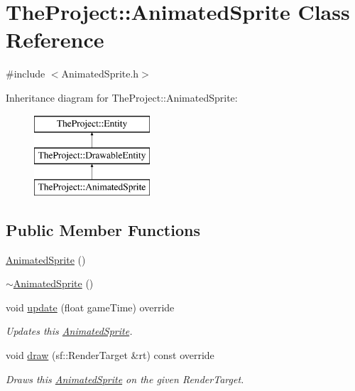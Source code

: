 \hypertarget{class_the_project_1_1_animated_sprite}{}\section{The\+Project\+:\+:Animated\+Sprite Class Reference}
\label{class_the_project_1_1_animated_sprite}


{\ttfamily \#include $<$Animated\+Sprite.\+h$>$}

Inheritance diagram for The\+Project\+:\+:Animated\+Sprite\+:\begin{figure}[H]
\begin{center}
\leavevmode
\includegraphics[height=3.000000cm]{class_the_project_1_1_animated_sprite}
\end{center}
\end{figure}
\subsection*{Public Member Functions}
\begin{DoxyCompactItemize}
\item 
\mbox{\hyperlink{class_the_project_1_1_animated_sprite_a77d348e2fe20a4ebe5b282c3c6e80b63}{Animated\+Sprite}} ()
\item 
\mbox{\hyperlink{class_the_project_1_1_animated_sprite_a7cae0bf92099bbd332f35d118d3c5d58}{$\sim$\+Animated\+Sprite}} ()
\item 
void \mbox{\hyperlink{class_the_project_1_1_animated_sprite_a25b0a4ce67cceb27c8e777443d1a8249}{update}} (float game\+Time) override
\begin{DoxyCompactList}\small\item\em Updates this \mbox{\hyperlink{class_the_project_1_1_animated_sprite}{Animated\+Sprite}}. \end{DoxyCompactList}\item 
void \mbox{\hyperlink{class_the_project_1_1_animated_sprite_ac958bbf4a60173500e5ad3bb57d268ca}{draw}} (sf\+::\+Render\+Target \&rt) const override
\begin{DoxyCompactList}\small\item\em Draws this \mbox{\hyperlink{class_the_project_1_1_animated_sprite}{Animated\+Sprite}} on the given Render\+Target. \end{DoxyCompactList}\end{DoxyCompactItemize}


